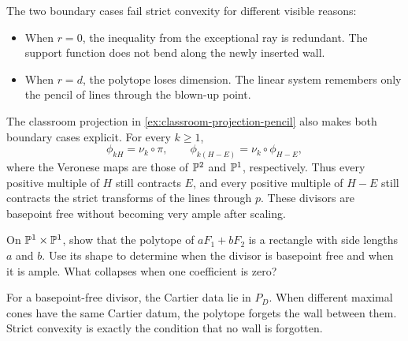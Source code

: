 The two boundary cases fail strict convexity for different visible
reasons:

\begin{itemize}
\item When \(r=0\), the inequality from the exceptional ray is
redundant. The support function does not bend along the newly inserted
wall.

\item When \(r=d\), the polytope loses dimension. The linear system
remembers only the pencil of lines through the blown-up point.
\end{itemize}

The classroom projection in \cref{ex:classroom-projection-pencil}
also makes both boundary cases explicit. For every \(k\geq1\),
\[
\phi_{kH}=\nu_k\circ\pi,\qquad
\phi_{k(H-E)}=\nu_k\circ\phi_{H-E},
\]
where the Veronese maps are those of \(\mathbb{P}^2\) and \(\mathbb{P}^1\),
respectively. Thus every positive multiple of \(H\) still contracts
\(E\), and every positive multiple of \(H-E\) still contracts the
strict transforms of the lines through \(p\). These divisors are
basepoint free without becoming very ample after scaling.

\begin{pauseandthink}
On \(\mathbb{P}^1\times\mathbb{P}^1\), show that the polytope of
\(aF_1+bF_2\) is a rectangle with side lengths \(a\) and \(b\).
Use its shape to determine when the divisor is basepoint free and when
it is ample. What collapses when one coefficient is zero?
\end{pauseandthink}

For a basepoint-free divisor, the Cartier data lie in \(P_D\). When
different maximal cones have the same Cartier datum, the polytope
forgets the wall between them. Strict convexity is exactly the
condition that no wall is forgotten.

